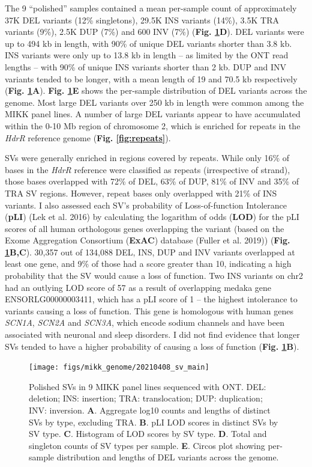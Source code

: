 \documentclass[
]{book}
\begin{document}
The 9 ``polished'' samples contained a mean per-sample count of approximately 37K DEL variants (12\% singletons), 29.5K INS variants (14\%), 3.5K TRA variants (9\%), 2.5K DUP (7\%) and 600 INV (7\%) (\textbf{Fig. \ref{fig:SV-main}D}). DEL variants were up to 494 kb in length, with 90\% of unique DEL variants shorter than 3.8 kb. INS variants were only up to 13.8 kb in length -- as limited by the ONT read lengths -- with 90\% of unique INS variants shorter than 2 kb. DUP and INV variants tended to be longer, with a mean length of 19 and 70.5 kb respectively (\textbf{Fig. \ref{fig:SV-main}A}). \textbf{Fig. \ref{fig:SV-main}E} shows the per-sample distribution of DEL variants across the genome. Most large DEL variants over 250 kb in length were common among the MIKK panel lines. A number of large DEL variants appear to have accumulated within the 0-10 Mb region of chromosome 2, which is enriched for repeats in the \emph{HdrR} reference genome (\textbf{Fig. \ref{fig:repeats}}).

SVs were generally enriched in regions covered by repeats. While only 16\% of bases in the \emph{HdrR} reference were classified as repeats (irrespective of strand), those bases overlapped with 72\% of DEL, 63\% of DUP, 81\% of INV and 35\% of TRA SV regions. However, repeat bases only overlapped with 21\% of INS variants. I also assessed each SV's probability of Loss-of-function Intolerance (\textbf{pLI}) (Lek et al. 2016) by calculating the logarithm of odds (\textbf{LOD}) for the pLI scores of all human orthologous genes overlapping the variant (based on the Exome Aggregation Consortium (\textbf{ExAC}) database (Fuller et al. 2019)) (\textbf{Fig. \ref{fig:SV-main}B,C}). 30,357 out of 134,088 DEL, INS, DUP and INV variants overlapped at least one gene, and 9\% of those had a score greater than 10, indicating a high probability that the SV would cause a loss of function. Two INS variants on chr2 had an outlying LOD score of 57 as a result of overlapping medaka gene ENSORLG00000003411, which has a pLI score of 1 -- the highest intolerance to variants causing a loss of function. This gene is homologous with human genes \emph{SCN1A}, \emph{SCN2A} and \emph{SCN3A}, which encode sodium channels and have been associated with neuronal and sleep disorders. I did not find evidence that longer SVs tended to have a higher probability of causing a loss of function (\textbf{Fig. \ref{fig:SV-main}B}).



\begin{figure}
\texttt{[image: figs/mikk\_genome/20210408\_sv\_main]} \caption{Polished SVs in 9 MIKK panel lines sequenced with ONT. DEL: deletion; INS: insertion; TRA: translocation; DUP: duplication; INV: inversion. \textbf{A}. Aggregate log10 counts and lengths of distinct SVs by type, excluding TRA. \textbf{B}. pLI LOD scores in distinct SVs by SV type. \textbf{C}. Histogram of LOD scores by SV type. \textbf{D}. Total and singleton counts of SV types per sample. \textbf{E}. Circos plot showing per-sample distribution and lengths of DEL variants across the genome.}\label{fig:SV-main}
\end{figure}
\end{document}
